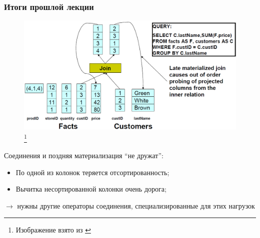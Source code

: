 \documentclass{beamer}
\begin{document}
\begin{frame}
\frametitle{Итоги прошлой лекции}

\begin{figure}[htb]
\includegraphics[width=\textwidth,height=0.50\textheight,keepaspectratio]{lm-join1.png} 
\footnote{\tiny{Изображение взято из \cite{Harizopoulos2009}}}
\end{figure}    

Соединения и поздняя материализация ``не дружат'':

\begin{itemize}
  \setlength\itemsep{1em}
  \item По одной из колонок теряется отсортированность;
  \item Вычитка несортированной колонки очень дорога;
\end{itemize}
$\longrightarrow$ нужны другие операторы соединения, специализированные для этих нагрузок

\end{frame}
\end{document}
